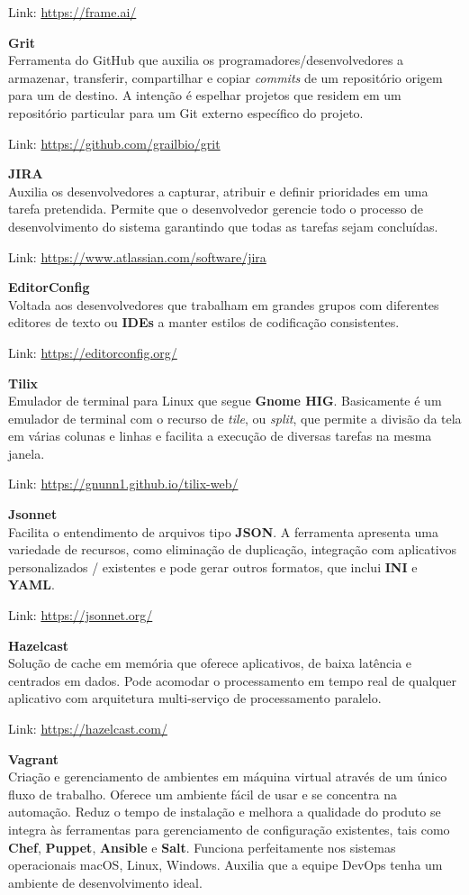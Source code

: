 \documentclass[fleqn,10pt]{../sty/SelfArx} %
\begin{document}
Link: \url{https://frame.ai/}

\textbf{Grit} \\
Ferramenta do GitHub que auxilia os programadores/desenvolvedores a armazenar, transferir, compartilhar e copiar \textit{commits} de um repositório origem para um de destino. A intenção é espelhar projetos que residem em um repositório particular para um Git externo específico do projeto.

Link: \url{https://github.com/grailbio/grit}

\textbf{JIRA} \\
Auxilia os desenvolvedores a capturar, atribuir e definir prioridades em uma tarefa pretendida. Permite que o desenvolvedor gerencie todo o processo de desenvolvimento do sistema garantindo que todas as tarefas sejam concluídas.

Link: \url{https://www.atlassian.com/software/jira}

\textbf{EditorConfig} \\
Voltada aos desenvolvedores que trabalham em grandes grupos com diferentes editores de texto ou \textbf{IDEs} a manter estilos de codificação consistentes.

Link: \url{https://editorconfig.org/}

\textbf{Tilix} \\
Emulador de terminal para Linux que segue \textbf{Gnome HIG}. Basicamente é um emulador de terminal com o recurso de \textit{tile}, ou \textit{split}, que permite a divisão da tela em várias colunas e linhas e facilita a execução de diversas tarefas na mesma janela.

Link: \url{https://gnunn1.github.io/tilix-web/}

\textbf{Jsonnet} \\
Facilita o entendimento de arquivos tipo \textbf{JSON}. A ferramenta apresenta uma variedade de recursos, como eliminação de duplicação, integração com aplicativos personalizados / existentes e pode gerar outros formatos, que inclui \textbf{INI} e \textbf{YAML}.

Link: \url{https://jsonnet.org/}

\textbf{Hazelcast} \\
Solução de cache em memória que oferece aplicativos, de baixa latência e centrados em dados. Pode acomodar o processamento em tempo real de qualquer aplicativo com arquitetura multi-serviço de processamento paralelo.

Link: \url{https://hazelcast.com/}

\textbf{Vagrant} \\
Criação e gerenciamento de ambientes em máquina virtual através de um único fluxo de trabalho. Oferece um ambiente fácil de usar e se concentra na automação. Reduz o tempo de instalação e melhora a qualidade do produto se integra às ferramentas para gerenciamento de configuração existentes, tais como \textbf{Chef}, \textbf{Puppet}, \textbf{Ansible} e \textbf{Salt}. Funciona perfeitamente nos sistemas operacionais macOS, Linux, Windows. Auxilia que a equipe DevOps tenha um ambiente de desenvolvimento ideal.
\end{document}
